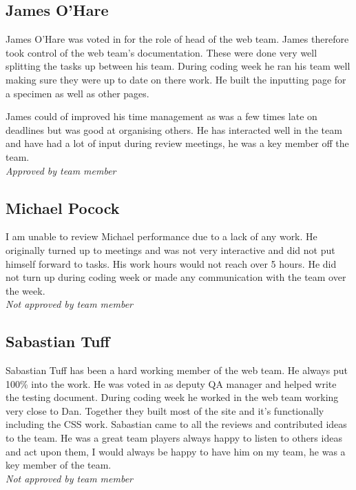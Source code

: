 \subsection{James O’Hare}
    James O’Hare was voted in for the role of head of the web team. James therefore took control of the web team's documentation. These were done very well splitting the tasks up between his team. During coding week he ran his team well making sure they were up to date on there work. He built the inputting page for a specimen as well as other pages. 
    
    James could of improved his time management as was a few times late on deadlines but was good at organising others. He has interacted well in the team and have had a lot of input during review meetings, he was a key member off the team.\\
    \emph{Approved by team member}

\subsection{Michael Pocock}
    I am unable to review Michael performance due to a lack of any work. He originally turned up to meetings and was not very interactive and did not put himself forward to tasks. His work hours would not reach over 5 hours. He did not turn up during coding week or made any communication with the team over the week.\\
    \emph{Not approved by team member}

\subsection{Sabastian Tuff}
    Sabastian Tuff has been a hard working member of the web team. He always put 100\% into the work. He was voted in as deputy QA manager and helped write the testing document.  During coding week he worked in the web team working very close to Dan. Together they built most of the site and it’s functionally including the CSS work. 
    Sabastian came to all the reviews and contributed ideas to the team. He was a great team players always happy to listen to others ideas and act upon them, I would always be happy to have him on my team, he was a key member of the team.\\
    \emph{Not approved by team member}

